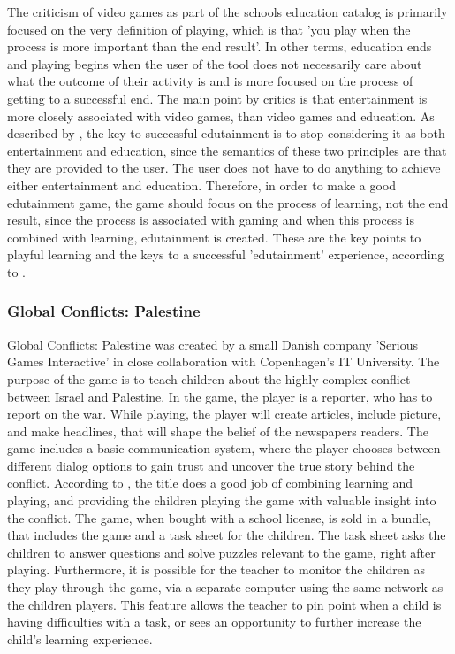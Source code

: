 The criticism of video games as part of the schools education catalog is primarily focused on the very definition of playing, which is that 'you play when the process is more important than the end result'.
In other terms, education ends and playing begins when the user of the tool does not necessarily care about what the outcome of their activity is and is more focused on the process of getting to a successful end.
The main point by critics is that entertainment is more closely associated with video games, than video games and education.
As described by \citep{edunoty}, the key to successful edutainment is to stop considering it as both entertainment and education, since the semantics of these two principles are that they are provided to the user.
The user does not have to do anything to achieve either entertainment and education.
Therefore, in order to make a good edutainment game, the game should focus on the process of learning, not the end result, since the process is associated with gaming and when this process is combined with learning, edutainment is created.
These are the key points to playful learning and the keys to a successful 'edutainment' experience, according to \cite{edunoty}.

\subsubsection{Global Conflicts: Palestine}

Global Conflicts: Palestine was created by a small Danish company 'Serious Games Interactive' in close collaboration with Copenhagen's IT University.
The purpose of the game is to teach children about the highly complex conflict between Israel and Palestine.
In the game, the player is a reporter, who has to report on the war.
While playing, the player will create articles, include picture, and make headlines, that will shape the belief of the newspapers readers.
The game includes a basic communication system, where the player chooses between different dialog options to gain trust and uncover the true story behind the conflict. According to \cite{laeringpaaspil}, the title does a good job of combining learning and playing, and providing the children playing the game with valuable insight into the conflict.
The game, when bought with a school license, is sold in a bundle, that includes the game and a task sheet for the children.
The task sheet asks the children to answer questions and solve puzzles relevant to the game, right after playing.
Furthermore, it is possible for the teacher to monitor the children as they play through the game, via a separate computer using the same network as the children players.
This feature allows the teacher to pin point when a child is having difficulties with a task, or sees an opportunity to further increase the child's learning experience.\newline

